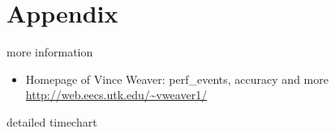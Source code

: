 \appendix
\section{Appendix}

\begin{frame}{more information}
\begin{itemize}
  \item Homepage of Vince Weaver: perf\_events, accuracy and more
    \url{http://web.eecs.utk.edu/~vweaver1/}
\end{itemize}
\end{frame}

\begin{frame}{detailed timechart}
\end{frame}

